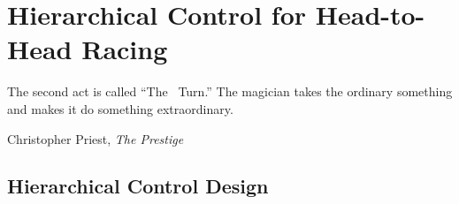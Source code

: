 \chapter{Hierarchical Control for Head-to-Head Racing} 
\epigraph{\flushright The second act is called ``The~ Turn.'' The magician takes the ordinary something and makes it do something extraordinary.}{Christopher Priest, \textit{The Prestige}}
\label{chapter:hier}
\section{Hierarchical Control Design}
